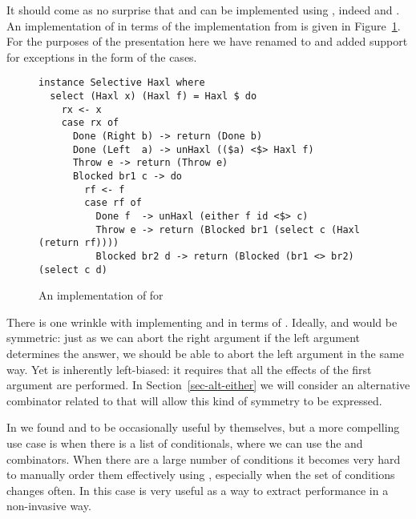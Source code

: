 It should come as no surprise that  and  can be
implemented using , indeed  and .  An implementation of  in terms of the \Haxl
implementation from \citet{marlow2014haxl} is given in
Figure~\ref{fig-haxl-select}.  For the purposes of the presentation
here we have renamed  to  and added support for
exceptions in the form of the  cases.

\begin{figure}
\begin{verbatim}
instance Selective Haxl where
  select (Haxl x) (Haxl f) = Haxl $ do
    rx <- x
    case rx of
      Done (Right b) -> return (Done b)
      Done (Left  a) -> unHaxl (($a) <$> Haxl f)
      Throw e -> return (Throw e)
      Blocked br1 c -> do
        rf <- f
        case rf of
          Done f  -> unHaxl (either f id <$> c)
          Throw e -> return (Blocked br1 (select c (Haxl (return rf))))
          Blocked br2 d -> return (Blocked (br1 <> br2) (select c d)
\end{verbatim}
\caption{An implementation of  for }
\label{fig-haxl-select}
\end{figure}

There is one wrinkle with implementing  and 
in terms of . Ideally,  and  would be
symmetric: just as we can abort the right argument if the left
argument determines the answer, we should be able to abort the left
argument in the same way. Yet  is inherently left-biased:
it requires that all the effects of the first argument are performed.
In Section~\ref{sec-alt-either} we will consider an alternative
combinator related to  that will allow this kind of
symmetry to be expressed.

In \Haxl we found  and  to be occasionally useful by
themselves, but a more compelling use case is when there is a list of
conditionals, where we can use the  and 
combinators.  When there are a large number of conditions it becomes
very hard to manually order them effectively using ,
especially when the set of conditions changes often. In this case
 is very useful as a way to extract performance in a
non-invasive way.

